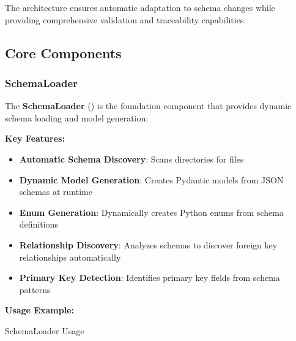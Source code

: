 The architecture ensures automatic adaptation to schema changes while providing comprehensive validation and traceability capabilities.

\subsection{Core Components}
\label{sec:python-core-components}

\subsubsection{SchemaLoader}
\label{sec:python-schema-loader}

The \textbf{SchemaLoader} () is the foundation component that provides dynamic schema loading and model generation:

\textbf{Key Features:}
\begin{itemize}
    \item \textbf{Automatic Schema Discovery}: Scans directories for  files
    \item \textbf{Dynamic Model Generation}: Creates Pydantic models from JSON schemas at runtime
    \item \textbf{Enum Generation}: Dynamically creates Python enums from schema definitions
    \item \textbf{Relationship Discovery}: Analyzes schemas to discover foreign key relationships automatically
    \item \textbf{Primary Key Detection}: Identifies primary key fields from schema patterns
\end{itemize}

\textbf{Usage Example:}

\begin{pythonexample}{SchemaLoader Usage}
\end{pythonexample}

